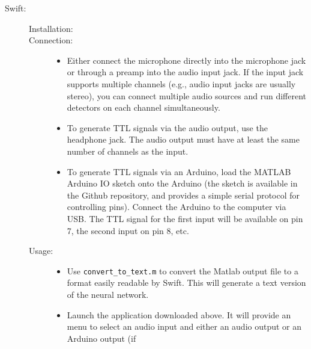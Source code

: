 \documentclass[10pt,letterpaper]{article}
\providecommand{\DIFaddtex}[1]{{\protect\color{blue}\uwave{#1}}} %
\providecommand{\DIFdeltex}[1]{{\protect\color{red}\sout{#1}}}                      %
\providecommand{\DIFaddbegin}{} %
\providecommand{\DIFaddend}{} %
\providecommand{\DIFdelbegin}{} %
\providecommand{\DIFdelend}{} %
\providecommand{\DIFadd}[1]{\texorpdfstring{\DIFaddtex{#1}}{#1}} %
\providecommand{\DIFdel}[1]{\texorpdfstring{\DIFdeltex{#1}}{}} %
\newcommand{\DIFscaledelfig}{0.5}
\newlength{\DIFdelgraphicswidth} %
\newlength{\DIFdelgraphicsheight} %
\newcommand{\DIFaddincludegraphics}[2][]{{\color{blue}\fbox{\DIFOincludegraphics[#1]{#2}}}} %
\newcommand{\DIFdelincludegraphics}[2][]{%
\sbox{\DIFdelgraphicsbox}{\DIFOincludegraphics[#1]{#2}}%
\settoboxwidth{\DIFdelgraphicswidth}{\DIFdelgraphicsbox} %
\settoboxtotalheight{\DIFdelgraphicsheight}{\DIFdelgraphicsbox} %
\scalebox{\DIFscaledelfig}{%
\parbox[b]{\DIFdelgraphicswidth}{\usebox{\DIFdelgraphicsbox}\\[-\baselineskip] \rule{\DIFdelgraphicswidth}{0em}}\llap{\resizebox{\DIFdelgraphicswidth}{\DIFdelgraphicsheight}{%
\setlength{\unitlength}{\DIFdelgraphicswidth}%
\begin{picture}(1,1)%
\thicklines\linethickness{2pt} %
{\color[rgb]{1,0,0}\put(0,0){\framebox(1,1){}}}%
{\color[rgb]{1,0,0}\put(0,0){\line( 1,1){1}}}%
{\color[rgb]{1,0,0}\put(0,1){\line(1,-1){1}}}%
\end{picture}%
}\hspace*{3pt}}} %
} %
\DeclareRobustCommand{\DIFaddbegin}{\DIFOaddbegin \let\includegraphics\DIFaddincludegraphics} %
\DeclareRobustCommand{\DIFaddend}{\DIFOaddend \let\includegraphics\DIFOincludegraphics} %
\DeclareRobustCommand{\DIFdelbegin}{\DIFOdelbegin \let\includegraphics\DIFdelincludegraphics} %
\DeclareRobustCommand{\DIFdelend}{\DIFOaddend \let\includegraphics\DIFOincludegraphics} %
\begin{document}
\begin{description}
\begin{description}
  \DIFaddend \item[Swift:]\DIFaddbegin \hfill
    \DIFaddend \begin{description}
    \item[Installation:]\hfill
    \item[Connection:]\hfill
      \begin{itemize}
      \item Either connect the microphone directly into the microphone jack or through a 
      preamp into the audio input jack. If the input jack supports multiple channels (e.g., 
      audio input jacks are usually stereo), you can connect multiple audio sources and run 
      different detectors on each channel simultaneously.
      \item To generate TTL signals via the audio output, use the headphone jack. The 
      audio output must have at least the same number of channels as the input.
      \item To generate TTL signals via an Arduino, load the MATLAB Arduino IO sketch 
      onto the Arduino (the sketch is available in the Github repository, and provides a 
      simple serial protocol for controlling pins). Connect the Arduino 
      to the computer via USB. The TTL signal for the first input will be available on 
      pin 7, the second input on pin 8, etc.
      \end{itemize}
    \item[Usage:]\hfill
      \begin{itemize}
      \item Use {\tt convert\_to\_text.m} to convert the Matlab output file to a format 
      easily readable by Swift. This will generate a text version of the neural network.
      \item Launch the application downloaded above. It will provide an 
      menu to select an audio input and either an audio output or an Arduino output (if 

\end{itemize}
\end{description}
\end{description}
\end{description}
\end{document}
